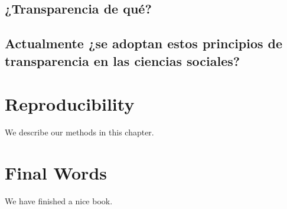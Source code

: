 \documentclass[
]{book}
\begin{document}
\hypertarget{transparencia-de-quuxe9}{%
\section{¿Transparencia de qué?}\label{transparencia-de-quuxe9}}

\hypertarget{actualmente-se-adoptan-estos-principios-de-transparencia-en-las-ciencias-sociales}{%
\section{Actualmente ¿se adoptan estos principios de transparencia en las ciencias sociales?}\label{actualmente-se-adoptan-estos-principios-de-transparencia-en-las-ciencias-sociales}}

\hypertarget{reproducibility}{%
\chapter{Reproducibility}\label{reproducibility}}

We describe our methods in this chapter.

\hypertarget{final-words}{%
\chapter{Final Words}\label{final-words}}

We have finished a nice book.

  
\end{document}

